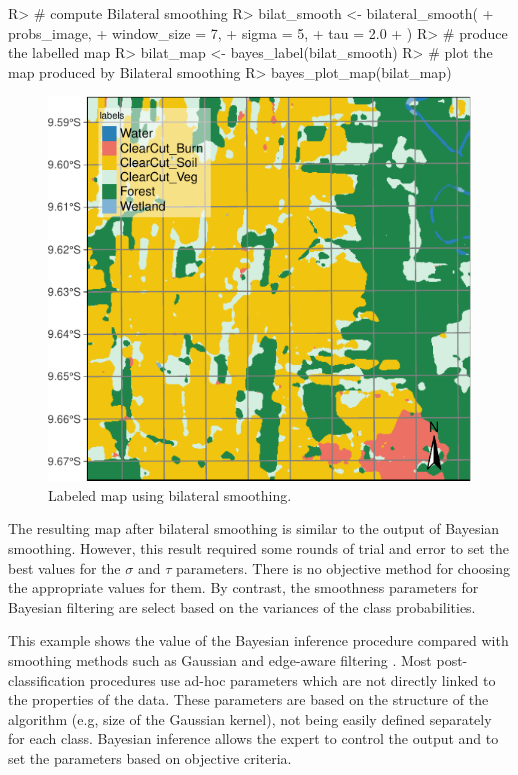 \documentclass[
  shortnames]{jss}
\begin{document}
\begin{CodeChunk}
\begin{CodeInput}
R> # compute Bilateral smoothing
R> bilat_smooth <- bilateral_smooth(
+     probs_image,
+     window_size = 7,
+     sigma = 5,
+     tau = 2.0
+ )
R> # produce the labelled map
R> bilat_map <- bayes_label(bilat_smooth)
R> # plot the map produced by Bilateral smoothing
R> bayes_plot_map(bilat_map)
\end{CodeInput}
\begin{figure}[h]

{\centering \includegraphics{Bayesian_smoothing_JSS_files/figure-latex/bilat-1} 

}

\caption[Labeled map using bilateral smoothing]{Labeled map using bilateral smoothing.}\label{fig:bilat}
\end{figure}
\end{CodeChunk}

The resulting map after bilateral smoothing is similar to the output of Bayesian smoothing. However, this result required some rounds of trial and error to set the best values for the \(\sigma\) and \(\tau\) parameters. There is no objective method for choosing the appropriate values for them. By contrast, the smoothness parameters for Bayesian filtering are select based on the variances of the class probabilities.

This example shows the value of the Bayesian inference procedure compared with smoothing methods such as Gaussian and edge-aware filtering \citep{Schindler2012}. Most post-classification procedures use ad-hoc parameters which are not directly linked to the properties of the data. These parameters are based on the structure of the algorithm (e.g, size of the Gaussian kernel), not being easily defined separately for each class. Bayesian inference allows the expert to control the output and to set the parameters based on objective criteria.
\end{document}
